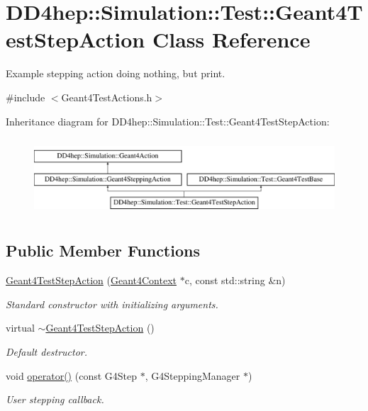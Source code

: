 \hypertarget{class_d_d4hep_1_1_simulation_1_1_test_1_1_geant4_test_step_action}{}\section{D\+D4hep\+:\+:Simulation\+:\+:Test\+:\+:Geant4\+Test\+Step\+Action Class Reference}
\label{class_d_d4hep_1_1_simulation_1_1_test_1_1_geant4_test_step_action}


Example stepping action doing nothing, but print.  




{\ttfamily \#include $<$Geant4\+Test\+Actions.\+h$>$}

Inheritance diagram for D\+D4hep\+:\+:Simulation\+:\+:Test\+:\+:Geant4\+Test\+Step\+Action\+:\begin{figure}[H]
\begin{center}
\leavevmode
\includegraphics[height=2.916667cm]{class_d_d4hep_1_1_simulation_1_1_test_1_1_geant4_test_step_action}
\end{center}
\end{figure}
\subsection*{Public Member Functions}
\begin{DoxyCompactItemize}
\item 
\hyperlink{class_d_d4hep_1_1_simulation_1_1_test_1_1_geant4_test_step_action_af4446b1635ed2c17bee1b7c074f3924d}{Geant4\+Test\+Step\+Action} (\hyperlink{class_d_d4hep_1_1_simulation_1_1_geant4_context}{Geant4\+Context} $\ast$c, const std\+::string \&n)
\begin{DoxyCompactList}\small\item\em Standard constructor with initializing arguments. \end{DoxyCompactList}\item 
virtual \hyperlink{class_d_d4hep_1_1_simulation_1_1_test_1_1_geant4_test_step_action_a0b645a06c4e038b0800054558ad99964}{$\sim$\+Geant4\+Test\+Step\+Action} ()
\begin{DoxyCompactList}\small\item\em Default destructor. \end{DoxyCompactList}\item 
void \hyperlink{class_d_d4hep_1_1_simulation_1_1_test_1_1_geant4_test_step_action_a19d915e8a634552f25a839a92843258a}{operator()} (const G4\+Step $\ast$, G4\+Stepping\+Manager $\ast$)
\begin{DoxyCompactList}\small\item\em User stepping callback. \end{DoxyCompactList}\end{DoxyCompactItemize}

